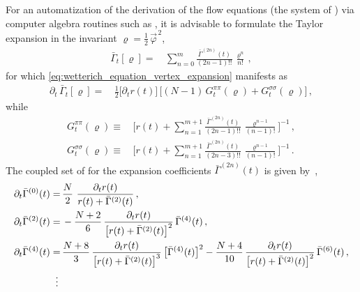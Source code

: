 For an automatization of the derivation of the flow equations (the system of \odes{}) via computer algebra routines such as \WAMwR{}, it is advisable to formulate the \frg{} Taylor expansion in the invariant ${\varrho = \tfrac{1}{2} \, \vec{\varphi}^{\, 2}}$,
\begin{align}
	\bar{\Gamma}_t [ \varrho ] =\, & \sum_{n = 0}^{m} \frac{\bar{\Gamma}^{(2n)} (t)}{(2n - 1)!!}\, \frac{\varrho^n}{n!} \, ,
\end{align}
for which \cref{eq:wetterich_equation_vertex_expansion} manifests as
\begin{align}
	\partial_t\, \bar{\Gamma}_t [ \varrho ] =\, & \frac{1}{2} \big[ \partial_t r ( t ) \big] \, \big[ ( N - 1 ) \, G^{\pi\pi}_t ( \varrho ) + G^{\sigma\sigma}_t ( \varrho ) \big] \, ,
\end{align}
while
\begin{subequations}
\begin{align}
	G^{\pi \pi}_t ( \varrho ) \equiv\, & \bigg[ r ( t ) + \sum_{n = 1}^{m+1} \frac{\bar{\Gamma}^{(2 n)} (t)}{( 2 n - 1)!!}\, \frac{\varrho^{n-1}}{(n - 1)!} \bigg]^{-1} \, ,\\
	G^{\sigma \sigma}_t ( \varrho ) \equiv\, & \bigg[ r ( t ) + \sum_{n = 1}^{m+1} \frac{\bar{\Gamma}^{(2 n)} (t)}{( 2 n - 3)!!}\, \frac{\varrho^{n - 1}}{(n - 1)!} \bigg]^{-1} \, .
\end{align}
\end{subequations}
The coupled set of \odes{} for the expansion coefficients $\bar{\Gamma}^{(2n)} ( t )$ is given by~\cite{Keitel:2011pn,Moroz:2011thesis},
\begin{subequations}\label{eq:example_vertex_expansion}
\begin{align}
	\partial_t \bar{\Gamma}^{(0)}( t ) = \, & \frac{N}{2} \,\, \frac{\partial_t r ( t )}{r ( t ) + \bar{\Gamma}^{(2)}( t ) } \, ,	 \label{eq:example_vertex_expansion_zero}	\\
	\partial_t \bar{\Gamma}^{(2)}( t ) = \, & - \frac{N + 2}{6} \, \frac{\partial_t r ( t )}{\big[ r ( t ) + \bar{\Gamma}^{(2)}( t ) \big]^2}  \, \bar{\Gamma}^{(4)}( t ) \, ,	 \label{eq:example_vertex_expansion_two}\\
	\partial_t \bar{\Gamma}^{(4)}( t ) = \, & \frac{N + 8}{3} \, \frac{\partial_t r ( t )}{\big[ r ( t ) + \bar{\Gamma}^{(2)}( t ) \big]^3} \, \big[ \bar{\Gamma}^{(4)}( t ) \big]^2 - \frac{N + 4}{10} \, \frac{\partial_t r ( t )}{\big[ r (t) + \bar{\Gamma}^{(2)}( t ) \big]^2} \, \bar{\Gamma}^{(6)}( t ) \, , \label{eq:example_vertex_expansion_four}\\* %
	\vdots \mkern7.0mu  &	\nonumber
\end{align}
\end{subequations}
